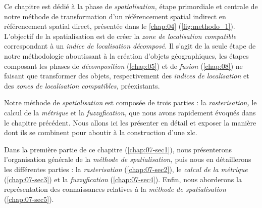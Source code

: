 Ce chapitre est dédié à la phase de \emph{spatialisation,} étape
primordiale et centrale de notre méthode de transformation d'un
référencement spatial indirect en référencement spatial direct,
présentée dans le \autoref{chap:04} (\autoref{fig:methodo_1}).
%
L'objectif de la spatialisation est de créer la \emph{zone de
  localisation compatible} correspondant à un \emph{indice de
  localisation décomposé.} Il s'agit de la seule étape de notre
méthodologie aboutissant à la création d'objets géographiques, les
étapes composant les phases de \emph{décomposition}
(\autoref{chap:05}) et de \emph{fusion} (\autoref{chap:08}) ne faisant
que transformer des objets, respectivement des \emph{indices de
  localisation} et des \emph{zones de localisation compatibles,}
préexistants.

Notre méthode de \emph{spatialisation} est composée de trois parties :
la \emph{rasterisation,} le calcul de la \emph{métrique} et la
\emph{fuzzyfication,} que nous avons rapidement évoqués dans le
chapitre précédent. Nous allons ici les présenter en détail et exposer
la manière dont ils se combinent pour aboutir à la construction d'une
\ac{zlc}.

Dans la première partie de ce chapitre (\autoref{chap:07-sec1}), nous
présenterons l'organisation générale de la \emph{méthode de
  spatialisation,} puis nous en détaillerons les différentes parties :
la \emph{rasterisation} (\autoref{chap:07-sec2}), le \emph{calcul de
  la métrique} (\autoref{chap:07-sec3}) et la \emph{fuzzyfication}
(\autoref{chap:07-sec4}). Enfin, nous aborderons la représentation des
connaissances relatives à la \emph{méthode de spatialisation}
(\autoref{chap:07-sec5}).

